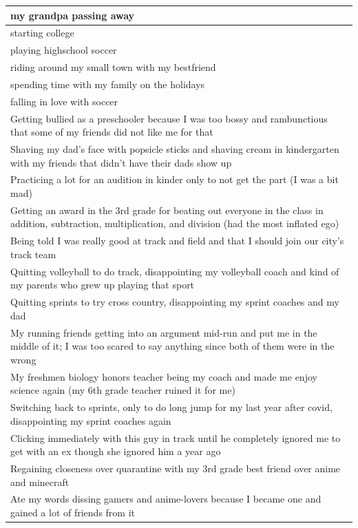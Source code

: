 \documentclass[
  .7em,
  letterpaper,
  DIV=11,
  numbers=noendperiod]{scrartcl}
\begin{document}
\begin{table}
\begin{tabular}{l}
\hline
my grandpa passing away\\
\hline
starting college\\
\hline
playing highschool soccer\\
\hline
riding around my small town with my bestfriend\\
\hline
spending time with my family on the holidays\\
\hline
falling in love with soccer\\
\hline
Getting bullied as a preschooler because I was too bossy and rambunctious that some of my friends did not like me for that\\
\hline
Shaving my dad's face with popsicle sticks and shaving cream in kindergarten with my friends that didn't have their dads show up\\
\hline
Practicing a lot for an audition in kinder only to not get the part (I was a bit mad)\\
\hline
Getting an award in the 3rd grade for beating out everyone in the class in addition, subtraction, multiplication, and division (had the most inflated ego)\\
\hline
Being told I was really good at track and field and that I should join our city's track team\\
\hline
Quitting volleyball to do track, disappointing my volleyball coach and kind of my parents who grew up playing that sport\\
\hline
Quitting sprints to try cross country, disappointing my sprint coaches and my dad\\
\hline
My running friends getting into an argument mid-run and put me in the middle of it; I was too scared to say anything since both of them were in the wrong\\
\hline
My freshmen biology honors teacher being my coach and made me enjoy science again (my 6th grade teacher ruined it for me)\\
\hline
Switching back to sprints, only to do long jump for my last year after covid, disappointing my sprint coaches again\\
\hline
Clicking immediately with this guy in track until he completely ignored me to get with an ex though she ignored him a year ago\\
\hline
Regaining closeness over quarantine with my 3rd grade best friend over anime and minecraft\\
\hline
Ate my words dissing gamers and anime-lovers because I became one and gained a lot of friends from it\\

\end{tabular}
\end{table}
\end{document}
